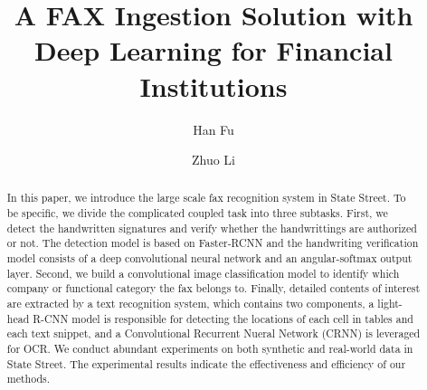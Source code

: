 \documentclass[sigconf]{acmart}
\begin{document}
%
\title{A FAX Ingestion Solution with Deep Learning for Financial Institutions}

%
\author{Han Fu}

\author{Zhuo Li}
%

%
\begin{abstract}
In this paper, we introduce the large scale fax recognition system in State Street. To be specific, we divide the complicated coupled task into three subtasks. First, we detect the handwritten signatures and verify whether the handwrittings are authorized or not. The detection model is based on Faster-RCNN and the handwriting verification model consists of a deep convolutional neural network and an angular-softmax output layer. Second, we build a convolutional image classification model to identify which company or functional category the fax belongs to. Finally, detailed contents of interest are extracted by a text recognition system, which contains two components, a light-head R-CNN model is responsible for detecting the locations of each cell in tables and each text snippet, and a Convolutional Recurrent Nueral Network (CRNN) is leveraged for OCR. We conduct abundant experiments on both synthetic and real-world data in State Street. The experimental results indicate the effectiveness and efficiency of our methods.

\end{abstract}
\end{document}
